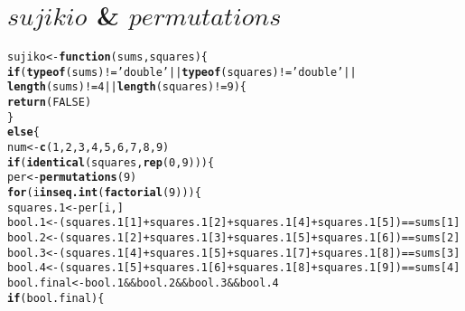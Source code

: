 \documentclass[12pt]{article}\usepackage[]{graphicx}\usepackage[]{color}
\makeatletter
\newcommand{\hlnum}[1]{\textcolor[rgb]{0.686,0.059,0.569}{#1}}%
\newcommand{\hlstr}[1]{\textcolor[rgb]{0.192,0.494,0.8}{#1}}%
\newcommand{\hlopt}[1]{\textcolor[rgb]{0,0,0}{#1}}%
\newcommand{\hlstd}[1]{\textcolor[rgb]{0.345,0.345,0.345}{#1}}%
\newcommand{\hlkwa}[1]{\textcolor[rgb]{0.161,0.373,0.58}{\textbf{#1}}}%
\newcommand{\hlkwb}[1]{\textcolor[rgb]{0.69,0.353,0.396}{#1}}%
\newcommand{\hlkwc}[1]{\textcolor[rgb]{0.333,0.667,0.333}{#1}}%
\newcommand{\hlkwd}[1]{\textcolor[rgb]{0.737,0.353,0.396}{\textbf{#1}}}%
\newenvironment{kframe}{%
 \def\at@end@of@kframe{}%
 \ifinner\ifhmode%
  \def\at@end@of@kframe{\end{minipage}}%
  \begin{minipage}{\columnwidth}%
 \fi\fi%
 \def\FrameCommand##1{\hskip\@totalleftmargin \hskip-\fboxsep
 \colorbox{shadecolor}{##1}\hskip-\fboxsep
     \hskip-\linewidth \hskip-\@totalleftmargin \hskip\columnwidth}%
 \MakeFramed {\advance\hsize-\width
   \@totalleftmargin\z@ \linewidth\hsize
   \@setminipage}}%
 {\par\unskip\endMakeFramed%
 \at@end@of@kframe}
\newenvironment{knitrout}{}{} %
\makeatother
\begin{document}
\section{$sujikio$ \& $permutations$}
\begin{knitrout}
\color{fgcolor}\begin{kframe}
\begin{alltt}
\hlstd{sujiko} \hlkwb{<-} \hlkwa{function}\hlstd{(}\hlkwc{sums}\hlstd{,} \hlkwc{squares}\hlstd{)\{}
  \hlkwa{if} \hlstd{(}\hlkwd{typeof}\hlstd{(sums)}\hlopt{!=}\hlstr{'double'}\hlopt{||}\hlkwd{typeof}\hlstd{(squares)}\hlopt{!=}\hlstr{'double'}\hlopt{||}
      \hlkwd{length}\hlstd{(sums)}\hlopt{!=}\hlnum{4}\hlopt{||}\hlkwd{length}\hlstd{(squares)}\hlopt{!=}\hlnum{9}\hlstd{)\{}
    \hlkwd{return}\hlstd{(}\hlnum{FALSE}\hlstd{)}
  \hlstd{\}}
  \hlkwa{else}\hlstd{\{}
    \hlstd{num} \hlkwb{<-} \hlkwd{c}\hlstd{(}\hlnum{1}\hlstd{,} \hlnum{2}\hlstd{,} \hlnum{3}\hlstd{,} \hlnum{4}\hlstd{,} \hlnum{5}\hlstd{,} \hlnum{6}\hlstd{,} \hlnum{7}\hlstd{,} \hlnum{8}\hlstd{,} \hlnum{9}\hlstd{)}
    \hlkwa{if} \hlstd{(}\hlkwd{identical}\hlstd{(squares,} \hlkwd{rep}\hlstd{(}\hlnum{0}\hlstd{,} \hlnum{9}\hlstd{)))\{}
      \hlstd{per} \hlkwb{<-} \hlkwd{permutations}\hlstd{(}\hlnum{9}\hlstd{)}
      \hlkwa{for} \hlstd{(i} \hlkwa{in} \hlkwd{seq.int}\hlstd{(}\hlkwd{factorial}\hlstd{(}\hlnum{9}\hlstd{)))\{}
        \hlstd{squares.1} \hlkwb{<-} \hlstd{per[i,]}
        \hlstd{bool.1} \hlkwb{<-} \hlstd{(squares.1[}\hlnum{1}\hlstd{]}\hlopt{+}\hlstd{squares.1[}\hlnum{2}\hlstd{]}\hlopt{+}\hlstd{squares.1[}\hlnum{4}\hlstd{]}\hlopt{+}\hlstd{squares.1[}\hlnum{5}\hlstd{])}\hlopt{==}\hlstd{sums[}\hlnum{1}\hlstd{]}
        \hlstd{bool.2} \hlkwb{<-} \hlstd{(squares.1[}\hlnum{2}\hlstd{]}\hlopt{+}\hlstd{squares.1[}\hlnum{3}\hlstd{]}\hlopt{+}\hlstd{squares.1[}\hlnum{5}\hlstd{]}\hlopt{+}\hlstd{squares.1[}\hlnum{6}\hlstd{])}\hlopt{==}\hlstd{sums[}\hlnum{2}\hlstd{]}
        \hlstd{bool.3} \hlkwb{<-} \hlstd{(squares.1[}\hlnum{4}\hlstd{]}\hlopt{+}\hlstd{squares.1[}\hlnum{5}\hlstd{]}\hlopt{+}\hlstd{squares.1[}\hlnum{7}\hlstd{]}\hlopt{+}\hlstd{squares.1[}\hlnum{8}\hlstd{])}\hlopt{==}\hlstd{sums[}\hlnum{3}\hlstd{]}
        \hlstd{bool.4} \hlkwb{<-} \hlstd{(squares.1[}\hlnum{5}\hlstd{]}\hlopt{+}\hlstd{squares.1[}\hlnum{6}\hlstd{]}\hlopt{+}\hlstd{squares.1[}\hlnum{8}\hlstd{]}\hlopt{+}\hlstd{squares.1[}\hlnum{9}\hlstd{])}\hlopt{==}\hlstd{sums[}\hlnum{4}\hlstd{]}
        \hlstd{bool.final} \hlkwb{<-} \hlstd{bool.1}\hlopt{&&}\hlstd{bool.2}\hlopt{&&}\hlstd{bool.3}\hlopt{&&}\hlstd{bool.4}
        \hlkwa{if} \hlstd{(bool.final)\{}

\end{alltt}
\end{kframe}
\end{knitrout}
\end{document}
